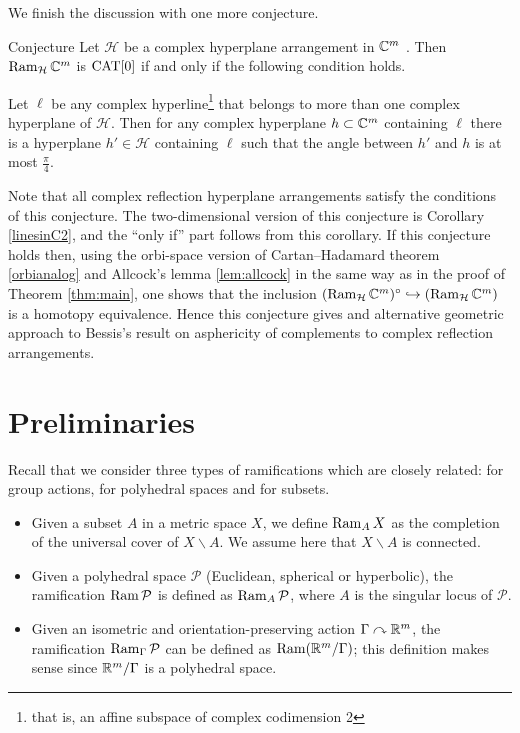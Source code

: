 \documentclass[oneside,a4paper]{article}
\begin{document}
We finish the discussion with one more conjecture.

\begin{thm}{Conjecture} Let $\mathcal H$ be
a complex hyperplane arrangement in $\mathbb{C}^m$ . Then  $\mathop{\rm Ram}\nolimits_{\mathcal H} \mathbb{C}^m$ is $\mathrm{CAT}[0]$
if and only if the following condition holds.

Let $\ell$ be any complex hyperline\footnote{that is, an affine subspace of complex codimension 2}
that belongs to more than one complex hyperplane of $\mathcal H$.
Then for any complex hyperplane $h\subset \mathbb{C}^m$ containing $\ell$ there is a hyperplane
$h'\in \mathcal H$ containing $\ell$ such that the angle between
$h'$ and $h$ is at most $\frac{\pi}{4}$.
\end{thm}

Note that all complex reflection hyperplane arrangements satisfy the conditions of this conjecture.
The two-dimensional version of this conjecture is Corollary \ref{linesinC2},
and the ``only if'' part follows from this corollary.
If this conjecture holds then, using the orbi-space version of Cartan--Hadamard theorem \ref{orbianalog}
and Allcock's lemma \ref{lem:allcock} in the same way as in the proof of Theorem \ref{thm:main},
one shows that the inclusion
$(\mathop{\rm Ram}\nolimits_{\mathcal H}\mathbb{C}^m)^\circ\hookrightarrow(\mathop{\rm Ram}\nolimits_{\mathcal H}\mathbb{C}^m)$ is a homotopy equivalence.
Hence this conjecture gives and alternative geometric approach to Bessis's result  \cite{bessis} on asphericity of complements to complex reflection arrangements.

\section{Preliminaries}\label{sec:prelim}

Recall that we consider three types of ramifications which are closely related:
for group actions, for polyhedral spaces and for subsets.

\begin{itemize}
\item Given a subset $A$ in a metric space $X$, we define $\mathop{\rm Ram}\nolimits_A X$ as  the completion of the universal cover of $X\backslash A$. We assume here that $X\backslash A$ is connected.
\item Given a polyhedral space $\mathcal{P}$ (Euclidean, spherical or hyperbolic), the ramification $\mathop{\rm Ram}\nolimits \mathcal{P}$ is defined as $\mathop{\rm Ram}\nolimits_{A} \mathcal{P}$, where $A$ is the singular locus of $\mathcal{P}$.
\item Given an isometric and orientation-preserving action $\Gamma\curvearrowright\mathbb{R}^m$, the ramification $\mathop{\rm Ram}\nolimits_{\Gamma} \mathcal{P}$ can be defined as $\mathop{\rm Ram}\nolimits (\mathbb{R}^m/\Gamma)$;
this definition makes sense since $\mathbb{R}^m/\Gamma$ is a polyhedral space.
\end{itemize}
\end{document}
